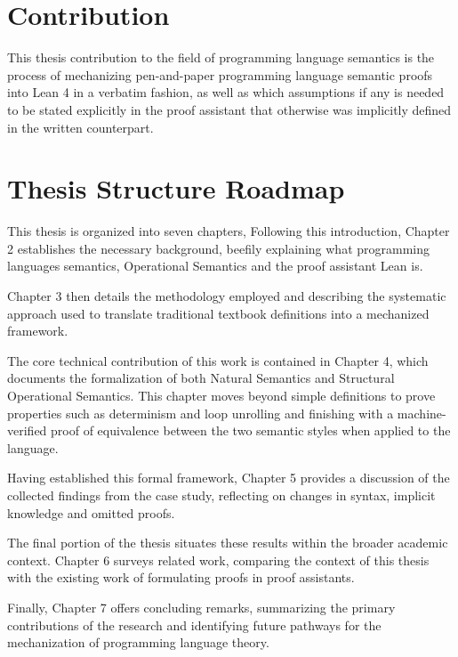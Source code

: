 %
%
%
\section{Contribution}
\label{intro:contribution}
This thesis contribution to the field of programming language semantics is the process of
mechanizing pen-and-paper programming language semantic proofs into Lean 4 in a verbatim fashion,
as well as which assumptions if any is needed to be stated explicitly in the proof
assistant that otherwise was implicitly defined in the written counterpart.

%
%
%
\label{intro:roadmap}
\section{Thesis Structure Roadmap} 
This thesis is organized into seven chapters,
Following this introduction, Chapter 2 establishes the necessary background,
beefily explaining what programming languages semantics, Operational Semantics and the proof assistant Lean is.

Chapter 3 then details the methodology employed and
describing the systematic approach used to translate traditional textbook
definitions into a mechanized framework.

The core technical contribution of this work is contained in Chapter 4,
which documents the formalization of both Natural Semantics
and Structural Operational Semantics.
This chapter moves beyond simple definitions to prove properties
such as determinism and loop unrolling and finishing with a machine-verified
proof of equivalence between the two semantic styles when
applied to the \While language.

Having established this formal framework, Chapter 5 provides a
discussion of the collected findings from the case study,
reflecting on changes in syntax, implicit knowledge and omitted proofs.

The final portion of the thesis situates these results within
the broader academic context.
Chapter 6 surveys related work, comparing the context of this thesis
with the existing work of formulating proofs in proof assistants.

Finally, Chapter 7 offers concluding remarks, summarizing the primary
contributions of the research and identifying future pathways for the
mechanization of programming language theory.